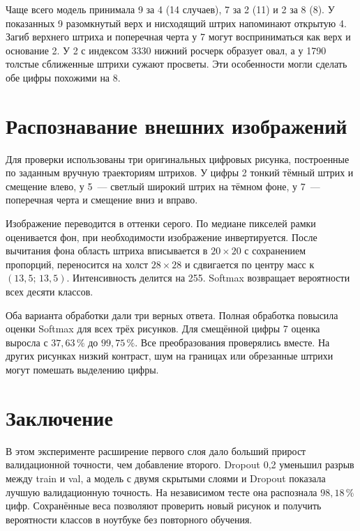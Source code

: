 Чаще всего модель принимала 9 за 4 (14 случаев), 7 за 2 (11) и 2 за 8 (8). У показанных 9 разомкнутый верх и нисходящий штрих напоминают открытую 4. Загиб верхнего штриха и поперечная черта у 7 могут восприниматься как верх и основание 2. У 2 с индексом 3330 нижний росчерк образует овал, а у 1790 толстые сближенные штрихи сужают просветы. Эти особенности могли сделать обе цифры похожими на 8.

\clearpage
\section{Распознавание внешних изображений}
Для проверки использованы три оригинальных цифровых рисунка, построенные по заданным вручную траекториям штрихов. У цифры 2 тонкий тёмный штрих и смещение влево, у 5~--- светлый широкий штрих на тёмном фоне, у 7~--- поперечная черта и смещение вниз и вправо.

Изображение переводится в оттенки серого. По медиане пикселей рамки оценивается фон, при необходимости изображение инвертируется. После вычитания фона область штриха вписывается в \(20\times20\) с сохранением пропорций, переносится на холст \(28\times28\) и сдвигается по центру масс к \((13{,}5;\,13{,}5)\). Интенсивность делится на 255. Softmax возвращает вероятности всех десяти классов.

Оба варианта обработки дали три верных ответа. Полная обработка повысила оценки Softmax для всех трёх рисунков. Для смещённой цифры 7 оценка выросла с \(37{,}63\,\%\) до \(99{,}75\,\%\). Все преобразования проверялись вместе. На других рисунках низкий контраст, шум на границах или обрезанные штрихи могут помешать выделению цифры.

\section{Заключение}
В этом эксперименте расширение первого слоя дало больший прирост валидационной точности, чем добавление второго. Dropout 0,2 уменьшил разрыв между train и val, а модель с двумя скрытыми слоями и Dropout показала лучшую валидационную точность. На независимом тесте она распознала \(98{,}18\,\%\) цифр. Сохранённые веса позволяют проверить новый рисунок и получить вероятности классов в ноутбуке без повторного обучения.

